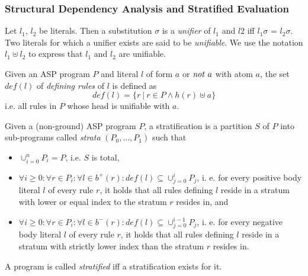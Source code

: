 \subsubsection{Structural Dependency Analysis and Stratified Evaluation}


\begin{definition}[Unification]
\label{def:prelims-asp-semantics-unification}
Let $l_1$, $l_2$ be literals. Then a substitution $\sigma$ is a \emph{unifier} of $l_1$ and $l2$ iff $l_{1}\sigma$ = $l_{2}\sigma$. Two literals for which a unifier exists are said to be \emph{unifiable}. We use the notation $l_1 \uplus l_2$ to express that $l_1$ and $l_2$ are unifiable.
\end{definition}

\begin{definition}
\label{def:prelims-asp-semantics}
Given an ASP program $P$ and literal $l$ of form $a$ or $\mathit{not}\ a$ with atom $a$, the set $\mathit{def}(l)$ of \emph{defining rules} of $l$ is defined as
\[
	\mathit{def}(l) = \{ r\ |\ r \in P \land h(r) \uplus a \}
\]
i.e. all rules in $P$ whose head is unifiable with $a$.
\end{definition}

\begin{definition}
\label{def:prelims-asp-semantics-stratification}
Given a (non-ground) ASP program $P$, a stratification is a partition $S$ of $P$ into sub-programs called \emph{strata} $(P_0,\ldots,P_1)$ such that
\begin{itemize}
	\item $\cup^{n}_{i = 0} P_i = P$, i.e. $S$ is total,
	\item $\forall i \geq 0: \forall r \in P_i: \forall l \in b^{+}(r): \mathit{def}(l) \subseteq \cup^{i}_{j = 0} P_j$, i. e. for every positive body literal $l$ of every rule $r$, it holds that all rules defining $l$ reside in a stratum with lower or equal index to the stratum $r$ resides in, and
	\item $\forall i \geq 0: \forall r \in P_i: \forall l \in b^{-}(r): \mathit{def}(l) \subseteq \cup^{i - 1}_{j = 0} P_j$, i. e. for every negative body literal $l$ of every rule $r$, it holds that all rules defining $l$ reside in a stratum with strictly lower index than the stratum $r$ resides in.
\end{itemize}
A program is called \emph{stratified} iff a stratification exists for it.
\end{definition}

\begin{definition}
\label{def:prelims-asp-semantics-stratified-eval}
\end{definition}

\begin{definition}
\end{definition}

\begin{definition}
\end{definition}

\begin{definition}
\end{definition}
